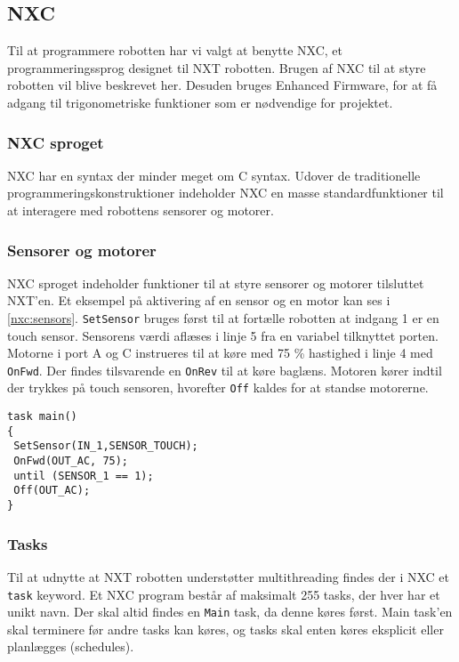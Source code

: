 \subsection{NXC}\label{nxc}
Til at programmere robotten har vi valgt at benytte NXC, et programmeringssprog designet til NXT robotten. 
Brugen af NXC til at styre robotten vil blive beskrevet her.\cite{NXC}
Desuden bruges Enhanced Firmware, for at få adgang til trigonometriske funktioner som er nødvendige for projektet.\cite{enhanced_firmware}

\subsubsection{NXC sproget}
NXC har en syntax der minder meget om C syntax. 
Udover de traditionelle programmeringskonstruktioner indeholder NXC en masse standardfunktioner til at interagere med robottens sensorer og motorer.

\subsubsection{Sensorer og motorer}
NXC sproget indeholder funktioner til at styre sensorer og motorer tilsluttet NXT'en.
Et eksempel på aktivering af en sensor og en motor kan ses i \cref{nxc:sensors}.
\lstinline[style=c]!SetSensor! bruges først til at fortælle robotten at indgang 1 er en touch sensor. 
Sensorens værdi aflæses i linje 5 fra en variabel tilknyttet porten.
Motorne i port A og C instrueres til at køre med 75 \% hastighed i linje 4 med \lstinline[style=c]!OnFwd!.  
Der findes tilsvarende en \lstinline[style=c]!OnRev! til at køre baglæns.
Motoren kører indtil der trykkes på touch sensoren, hvorefter \lstinline[style=c]!Off! kaldes for at standse motorerne.

\begin{lstlisting}[style=c,label=nxc:sensors, caption={Brug af motorer og sensorer}]
task main()
{
 SetSensor(IN_1,SENSOR_TOUCH);
 OnFwd(OUT_AC, 75);
 until (SENSOR_1 == 1);
 Off(OUT_AC);
}
\end{lstlisting}

\subsubsection{Tasks}
Til at udnytte at NXT robotten understøtter multithreading findes der i NXC et \lstinline[style=c]!task! keyword.
Et NXC program består af maksimalt 255 tasks, der hver har et unikt navn. 
Der skal altid findes en \lstinline[style=c]!Main! task, da denne køres først.
Main task'en skal terminere før andre tasks kan køres, og tasks skal enten køres eksplicit eller planlægges (schedules).

